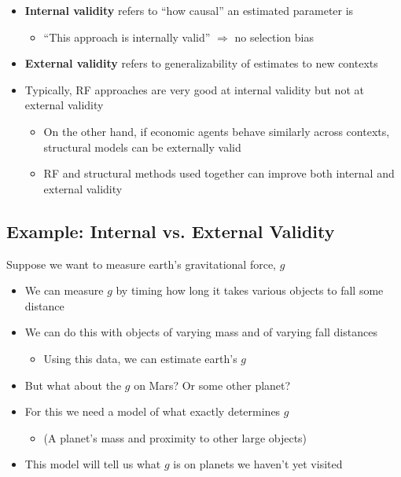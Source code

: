 \documentclass[11pt]{article}
\begin{document}
\begin{itemize}
\item \textbf{Internal validity} refers to ``how causal'' an estimated parameter is
\begin{itemize}
\item ``This approach is internally valid'' \(\Rightarrow\) no selection bias
\end{itemize}

\item \textbf{External validity} refers to generalizability of estimates to new contexts
\item Typically, RF approaches are very good at internal validity but not at external validity
\begin{itemize}
\item On the other hand, if economic agents behave similarly across contexts, structural models can be externally valid
\item RF and structural methods used together can improve both internal and external validity
\end{itemize}
\end{itemize}


\subsection{Example: Internal vs. External Validity}
\label{sec:org7c60958}

Suppose we want to measure earth's gravitational force, \(g\)

\begin{itemize}
\item We can measure \(g\) by timing how long it takes various objects to fall some distance
\item We can do this with objects of varying mass and of varying fall distances
\begin{itemize}
\item Using this data, we can estimate earth's \(g\)
\end{itemize}
\item But what about the \(g\) on Mars? Or some other planet?
\item For this we need a model of what exactly determines \(g\)
\begin{itemize}
\item (A planet's mass and proximity to other large objects)
\end{itemize}
\item This model will tell us what \(g\) is on planets we haven't yet visited
\end{itemize}
\end{document}
